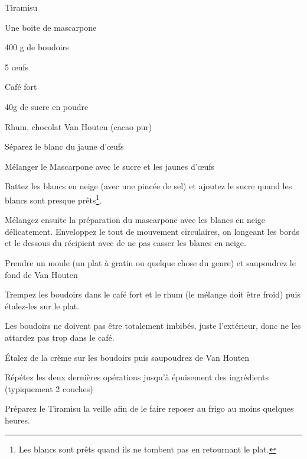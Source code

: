 \begin{recette}{Tiramisu}
\begin{ingredients}
\item Une boite de mascarpone
\item 400 g de boudoirs
\item 5 œufs
\item Café fort
\item 40g de sucre en poudre
\item Rhum, chocolat Van Houten (cacao pur)
\end{ingredients}

\begin{preparation}
\item Séparez le blanc du jaune d'œufs
\item Mélanger le Mascarpone avec le sucre et les jaunes d'œufs
\item Battez les blancs en neige (avec une pincée de sel) et ajoutez le sucre quand les blancs sont presque prêts\footnote{Les blancs sont prêts quand ils ne tombent pas en retournant le plat.}.
\item Mélangez ensuite la préparation du mascarpone avec les blancs en neige délicatement. Enveloppez le tout de mouvement circulaires, on longeant les bords et le dessous du récipient avec de ne pas casser les blancs en neige.
\item Prendre un moule (un plat à gratin ou quelque chose du genre) et saupoudrez le fond de Van Houten
\item Trempez les boudoirs dans le café fort et le rhum (le mélange doit être froid) puis étalez-les sur le plat.
\begin{remarque}
Les boudoirs ne doivent pas être totalement imbibés, juste l'extérieur, donc ne les attardez pas trop dans le café.
\end{remarque}
\item Étalez de la crème sur les boudoirs puis saupoudrez de Van Houten
\item Répétez les deux dernières opérations jusqu'à épuisement des ingrédients (typiquement 2 couches)
\end{preparation}

\begin{remarque}
Préparez le Tiramisu la veille afin de le faire reposer au frigo au moins quelques heures.
\end{remarque}
\end{recette}
